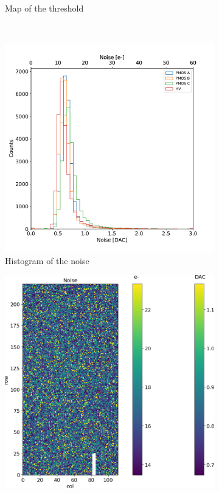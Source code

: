\begin{figure}
\begin{subfigure}[b]{0.49\textwidth}
                \caption{Map of the threshold}
                \label{fig:threshold_map}
            \end{subfigure}\\ 
            \hfill
            \begin{subfigure}[b]{0.49\textwidth}
                \centering
                \includegraphics[width=\linewidth]{figures/charaterization/noise_histogram.pdf}                
                \caption{Histogram of the noise}
                \label{fig:noise_hist}
            \end{subfigure}
            \hfill
            \begin{subfigure}[b]{0.49\textwidth}
                \centering
                \includegraphics[width=\linewidth]{figures/charaterization/noise_map.pdf}               

\end{subfigure}
\end{figure}

